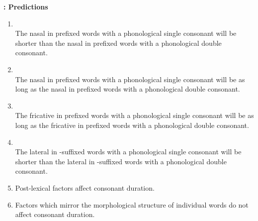\newpage
\textbf{: Predictions}\textsl{}

\begin{enumerate}

	\item {}  \\
	The nasal in prefixed words with a phonological single consonant will be shorter than the nasal in prefixed words with a phonological double consonant. %
	
	\item {}  \\
	The nasal in prefixed words with a phonological single consonant will be as long as the nasal in  prefixed words with a phonological double consonant.%



	\item {}  \\
	The fricative in prefixed words with a phonological single consonant will be as long as the fricative in prefixed words with a phonological double consonant. %
	

	
	\item {}  \\
	The lateral in -suffixed words with a phonological single consonant will be shorter than the lateral in -suffixed words with a phonological double consonant.%
	
		\item Post-lexical factors affect consonant duration.
		
		\item Factors which mirror the morphological structure of individual words do not affect consonant duration.
	
\end{enumerate}



